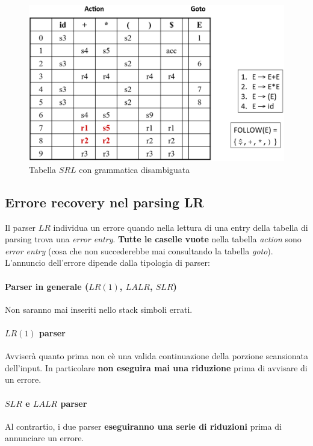 \begin{figure}[H]
\centering
\includegraphics[scale=0.4]{res/image/LR_table_disambiguos}
\caption{Tabella $SRL$ con grammatica disambiguata}
\label{img:LR_table_disambiguos}
\end{figure}

\subsection{Errore recovery nel parsing LR}
Il parser $LR$ individua un errore quando nella lettura di una entry della
tabella di parsing trova una \textit{error entry}. \textbf{Tutte le caselle
vuote} nella tabella \textit{action} sono \textit{error entry} (cosa che non
succederebbe mai consultando la tabella \textit{goto}). L'annuncio dell'errore
dipende dalla tipologia di parser:

\paragraph{Parser in generale ($LR(1)$, $LALR$, $SLR$)}
Non saranno mai inseriti nello stack simboli errati.
\paragraph{$LR(1)$ parser}
Avviser\`a quanto prima non c\`e una valida continuazione della porzione
scansionata dell'input. In particolare \textbf{non eseguira mai una riduzione}
prima di avvisare di un errore.

\paragraph{$SLR$ e $LALR$ parser}
Al contrartio, i due parser \textbf{eseguiranno una serie di riduzioni} prima
di annunciare un errore.

